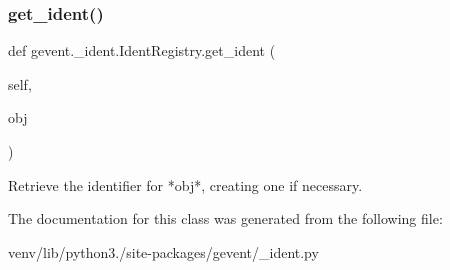 \subsubsection{\texorpdfstring{get\+\_\+ident()}{get\_ident()}}
{\footnotesize\ttfamily def gevent.\+\_\+ident.\+Ident\+Registry.\+get\+\_\+ident (\begin{DoxyParamCaption}\item[{}]{self,  }\item[{}]{obj }\end{DoxyParamCaption})}

\begin{DoxyVerb}Retrieve the identifier for *obj*, creating one
if necessary.
\end{DoxyVerb}
 

The documentation for this class was generated from the following file\+:\begin{DoxyCompactItemize}
\item 
venv/lib/python3./site-\/packages/gevent/\+\_\+ident.\+py\end{DoxyCompactItemize}

